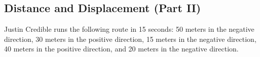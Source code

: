 \documentclass[../main-physics-problems.tex]{subfiles}
\begin{document}
\begin{questions}
\begin{parts}
\end{parts}

\clearpage
\begin{EnvUplevel}
    \subsection{Distance and Displacement (Part II)}
\end{EnvUplevel}

\question
Justin Credible runs the following route in 15 seconds: 50 meters in the negative direction, 30 meters in the positive direction, 15 meters in the negative direction, 40 meters in the positive direction, and 20 meters in the negative direction. 

\end{questions}
\end{document}
